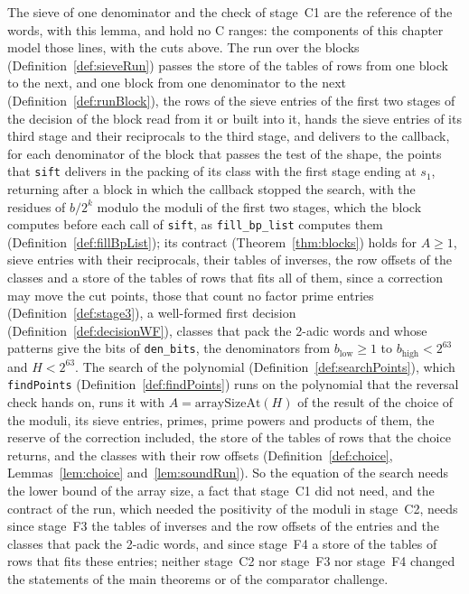 The sieve of one denominator and the check of stage~C1 are the reference of the words, with this
lemma, and hold no C ranges: the components of this chapter model those lines, with the cuts above.
The run over the blocks (Definition~\ref{def:sieveRun}) passes the store of the tables of rows from
one block to the next, and one block from one denominator to the next
(Definition~\ref{def:runBlock}), the rows of the sieve entries of the first two stages of the
decision of the block read from it or built into it, hands the sieve entries of its third stage and
their reciprocals to the third stage, and delivers to the callback, for each denominator of the
block that passes the test of the shape, the points that \verb|sift| delivers in the packing of its
class with the first stage ending at $s_1$, returning after a block in which the callback stopped
the search, with the residues of $b / 2^k$ modulo the moduli of the first two stages, which the
block computes before each call of \verb|sift|, as \verb|fill_bp_list| computes them
(Definition~\ref{def:fillBpList}); its contract (Theorem~\ref{thm:blocks}) holds for $A \ge 1$,
sieve entries with their reciprocals, their tables of inverses, the row offsets of the classes and a
store of the tables of rows that fits all of them, since a correction may move the cut points, those
that count no factor prime entries (Definition~\ref{def:stage3}), a well-formed first decision
(Definition~\ref{def:decisionWF}), classes that pack the 2-adic words and whose patterns give the
bits of \verb|den_bits|, the denominators from $b_{\mathrm{low}} \ge 1$ to
$b_{\mathrm{high}} < 2^{63}$ and $H < 2^{63}$. The search of the polynomial
(Definition~\ref{def:searchPoints}), which \verb|findPoints| (Definition~\ref{def:findPoints}) runs
on the polynomial that the reversal check hands on, runs it with $A = \mathrm{arraySizeAt}(H)$ of
the result of the choice of the moduli, its sieve entries, primes, prime powers and products of
them, the reserve of the correction included, the store of the tables of rows that the choice
returns, and the classes with their row offsets (Definition~\ref{def:choice},
Lemmas~\ref{lem:choice} and~\ref{lem:soundRun}). So the equation of the search needs the lower
bound of the array size, a fact that stage~C1 did not need, and the contract of the run, which
needed the positivity of the moduli in stage~C2, needs since stage~F3 the tables of inverses and the
row offsets of the entries and the classes that pack the 2-adic words, and since stage~F4 a store of
the tables of rows that fits these entries; neither stage~C2 nor stage~F3 nor stage~F4 changed the
statements of the main theorems or of the comparator challenge.

